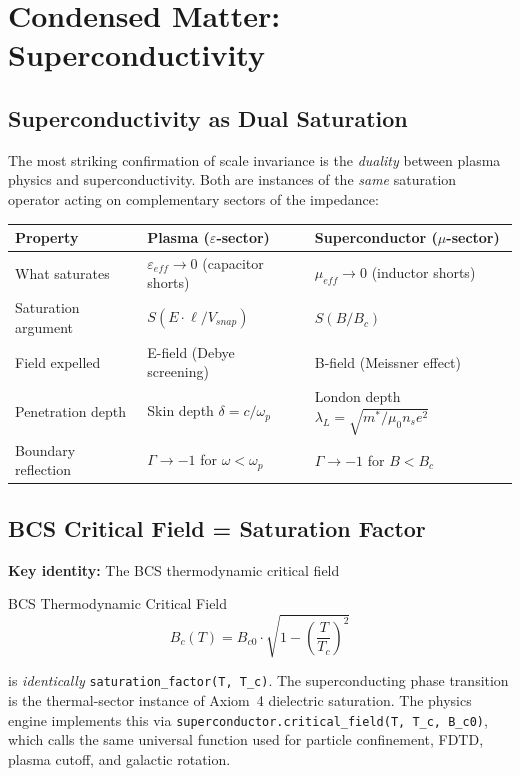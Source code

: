 
\chapter{Condensed Matter: Superconductivity}
\label{ch:condensed_matter}

\section{Superconductivity as Dual Saturation}
\label{sec:superconductivity_duality}

The most striking confirmation of scale invariance is the
\textit{duality} between plasma physics and superconductivity.
Both are instances of the \textit{same} saturation operator acting
on complementary sectors of the impedance:

\begin{center}
\small
\renewcommand{\arraystretch}{1.2}
\begin{tabular}{lll}
\toprule
\textbf{Property} & \textbf{Plasma ($\varepsilon$-sector)} & \textbf{Superconductor ($\mu$-sector)} \\
\midrule
What saturates      & $\varepsilon_{eff} \to 0$ (capacitor shorts)
                    & $\mu_{eff} \to 0$ (inductor shorts) \\
Saturation argument & $S(E \cdot \ell / V_{snap})$
                    & $S(B / B_c)$ \\
Field expelled      & E-field (Debye screening)
                    & B-field (Meissner effect) \\
Penetration depth   & Skin depth $\delta = c/\omega_p$
                    & London depth $\lambda_L = \sqrt{m^*/\mu_0 n_s e^2}$ \\
Boundary reflection & $\Gamma \to -1$ for $\omega < \omega_p$
                    & $\Gamma \to -1$ for $B < B_c$ \\
\bottomrule
\end{tabular}
\end{center}

\section{BCS Critical Field = Saturation Factor}

\textbf{Key identity:} The BCS thermodynamic critical field
\begin{resultbox}{BCS Thermodynamic Critical Field}
\begin{equation}
    B_c(T) = B_{c0} \cdot \sqrt{1 - \left(\frac{T}{T_c}\right)^{\!2}}
    \label{eq:bcs_saturation}
\end{equation}
\end{resultbox}
is \textit{identically} \texttt{saturation\_factor(T, T\_c)}.  The
superconducting phase transition is the thermal-sector instance of
Axiom~4 dielectric saturation.  The physics engine implements this
via \texttt{superconductor.critical\_field(T, T\_c, B\_c0)}, which
calls the same universal function used for particle confinement,
FDTD, plasma cutoff, and galactic rotation.

